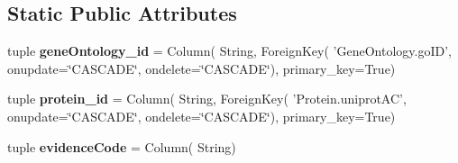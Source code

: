 \subsection*{Static Public Attributes}
\begin{DoxyCompactItemize}
\item 
\hypertarget{classsrc_1_1fr_1_1tagc_1_1rainet_1_1core_1_1data_1_1ProteinGOAnnotation_1_1ProteinGOAnnotation_a506efa89d4c9a21710ff107d6eef8830}{tuple {\bfseries gene\-Ontology\-\_\-id} = Column( String, Foreign\-Key( 'Gene\-Ontology.\-go\-I\-D', onupdate=\char`\"{}C\-A\-S\-C\-A\-D\-E\char`\"{}, ondelete=\char`\"{}C\-A\-S\-C\-A\-D\-E\char`\"{}), primary\-\_\-key=True)}\label{classsrc_1_1fr_1_1tagc_1_1rainet_1_1core_1_1data_1_1ProteinGOAnnotation_1_1ProteinGOAnnotation_a506efa89d4c9a21710ff107d6eef8830}

\item 
\hypertarget{classsrc_1_1fr_1_1tagc_1_1rainet_1_1core_1_1data_1_1ProteinGOAnnotation_1_1ProteinGOAnnotation_a87112845c42760193d1c760c66cacf87}{tuple {\bfseries protein\-\_\-id} = Column( String, Foreign\-Key( 'Protein.\-uniprot\-A\-C', onupdate=\char`\"{}C\-A\-S\-C\-A\-D\-E\char`\"{}, ondelete=\char`\"{}C\-A\-S\-C\-A\-D\-E\char`\"{}), primary\-\_\-key=True)}\label{classsrc_1_1fr_1_1tagc_1_1rainet_1_1core_1_1data_1_1ProteinGOAnnotation_1_1ProteinGOAnnotation_a87112845c42760193d1c760c66cacf87}

\item 
\hypertarget{classsrc_1_1fr_1_1tagc_1_1rainet_1_1core_1_1data_1_1ProteinGOAnnotation_1_1ProteinGOAnnotation_af4d6f3f214221d1858a896cd49daeeea}{tuple {\bfseries evidence\-Code} = Column( String)}\label{classsrc_1_1fr_1_1tagc_1_1rainet_1_1core_1_1data_1_1ProteinGOAnnotation_1_1ProteinGOAnnotation_af4d6f3f214221d1858a896cd49daeeea}

\end{DoxyCompactItemize}


